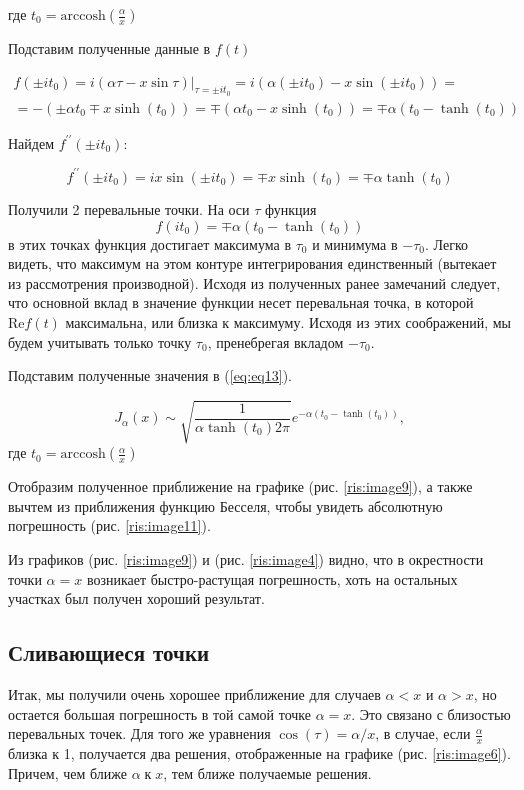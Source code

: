 \documentclass[14pt]{extarticle}
\renewcommand{\Re}{\mathrm{Re}}
\newcommand{\arccosh}{\mathrm{arccosh}}
\begin{document}
где $t_0 = \arccosh \left(\frac{\alpha}{x}\right)$

Подставим полученные данные в $f(t)$

\begin{eqnarray}\nonumber 
f(\pm i t_0) = i (\alpha \tau - x \sin \tau) |_{\tau=\pm i t_0} = i (\alpha (\pm i t_0) - x \sin (\pm i t_0)) = \\
\nonumber= -(\pm \alpha t_0 \mp x \sinh(t_0)) = \mp(\alpha t_0 - x \sinh(t_0)) = \mp\alpha(t_0 - \tanh(t_0))
\end{eqnarray}

Найдем $f^{\prime \prime}(\pm i t{_0})$:

\begin{equation}\nonumber 
f^{\prime \prime}(\pm i t{_0}) = i x \sin (\pm i t_0) = \mp x \sinh (t{_0}) = \mp\alpha\tanh(t_0)
\end{equation}

Получили 2 перевальные точки. На оси $\tau$ функция 
$$
f(i t_0) = \mp \alpha (t_0 - \tanh(t_0))
$$
в этих точках функция достигает максимума в $\tau_0$ и минимума в $-\tau_0$. Легко видеть, что максимум на этом контуре интегрирования единственный (вытекает из рассмотрения производной). Исходя из полученных ранее замечаний следует, что основной вклад в значение функции несет перевальная точка, в которой $\Re f(t)$ максимальна, или близка к максимуму. Исходя из этих соображений, мы будем учитывать только точку $\tau_0$, пренебрегая вкладом $-\tau_0$.

Подставим полученные значения в (\ref{eq:eq13}).

\begin{equation}\label{eq:eq20}
J_\alpha(x) \sim \sqrt{\frac{1}{\alpha \tanh(t_0) 2 \pi}} e^{-\alpha(t_0 - \tanh(t_0))},
\end{equation}
где $t_0 = \arccosh(\frac{\alpha}{x})$

Отобразим полученное приближение на графике (рис. \ref{ris:image9}), а также вычтем из приближения функцию Бесселя, чтобы увидеть абсолютную погрешность (рис. \ref{ris:image11}).


Из графиков (рис. \ref{ris:image9}) и (рис. \ref{ris:image4}) видно, что в окрестности точки $\alpha=x$ возникает быстро-растущая погрешность, хоть на остальных участках был получен хороший результат.

\subsection{Сливающиеся точки}
Итак, мы получили очень хорошее приближение для случаев $\alpha<x$ и $\alpha>x$, но остается большая погрешность в той самой точке $\alpha = x$. Это связано с близостью перевальных точек.\cite{Fedoryuk} Для того же уравнения $\cos(\tau)=\alpha / x$, в случае, если $\frac{\alpha}{x}$ близка к 1, получается два решения, отображенные на графике (рис. \ref{ris:image6}). Причем, чем ближе $\alpha\;к\;x$, тем ближе получаемые решения.
\end{document}
